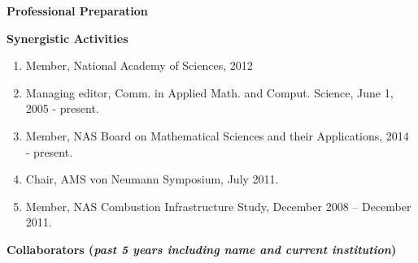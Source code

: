 \documentclass[11pt,letterpaper,english]{article}
\begin{document}
{\begin{flushleft} {\bf Professional Preparation}
{}


\vspace{.04in}
{\bf Synergistic Activities}
\vspace{-6pt}
\begin{enumerate} \itemsep1pt \parskip0pt 
\item Member, National Academy of Sciences, 2012 \\ 
\item Managing editor, Comm. in Applied Math. and Comput. Science, June 1, 2005 - present.\\
\item Member, NAS Board on Mathematical Sciences and their Applications, 2014 - present. 
\item Chair, AMS von Neumann Symposium, July 2011. \\
\item Member, NAS Combustion Infrastructure Study, December 2008 -- December 2011.\\
\end{enumerate} 

\vspace{-6pt}
{\bf Collaborators ({\emph{past 5 years including name and current institution}})} 
{\parindent 16pt

}
\end{flushleft}}
\end{document}
